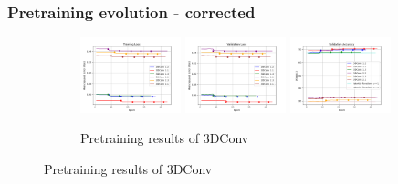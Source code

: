 \documentclass{beamer}
\begin{document}
\begin{frame}
    \frametitle{Pretraining evolution - corrected}
    \begin{figure}[htbp]
        \centering    
        \begin{subfigure}[b]{\textwidth}
            \centering
            \includegraphics[width=0.32\textwidth]{./entities/pretrained_new/baseline/train_losses.png}
            \includegraphics[width=0.32\textwidth]{./entities/pretrained_new/baseline/val_losses.png}
            \includegraphics[width=0.32\textwidth]{./entities/pretrained_new/baseline/val_accs.png}
            \caption{Pretraining results of 3DConv}
        \end{subfigure}
        \hfill
    

\end{figure}
\end{frame}
\end{document}
